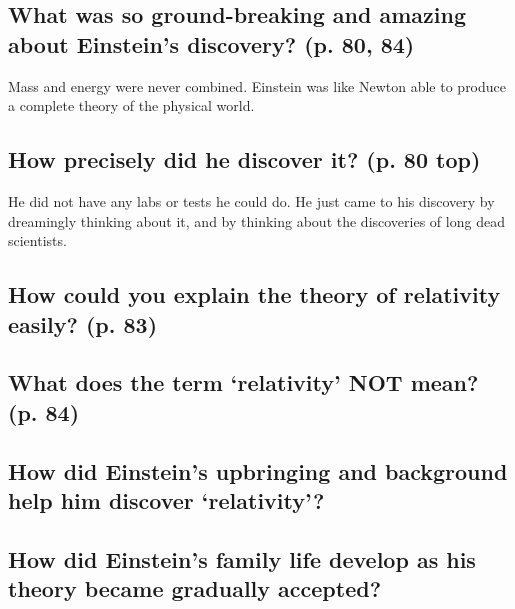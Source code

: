 \subsection*{What was so ground-breaking and amazing about Einstein’s discovery? (p. 80, 84)}
Mass and energy were never combined. Einstein was like Newton able to produce a complete theory of the physical world.

\subsection*{How precisely did he discover it? (p. 80 top)}
He did not have any labs or tests he could do. He just came to his discovery by dreamingly thinking about it, and by thinking about the discoveries of long dead scientists.

\subsection*{How could you explain the theory of relativity easily? (p. 83)}

\subsection*{What does the term ‘relativity’ NOT mean? (p. 84)}

\subsection*{How did Einstein’s upbringing and background help him discover ‘relativity’?}

\subsection*{How did Einstein’s family life develop as his theory became gradually accepted?}